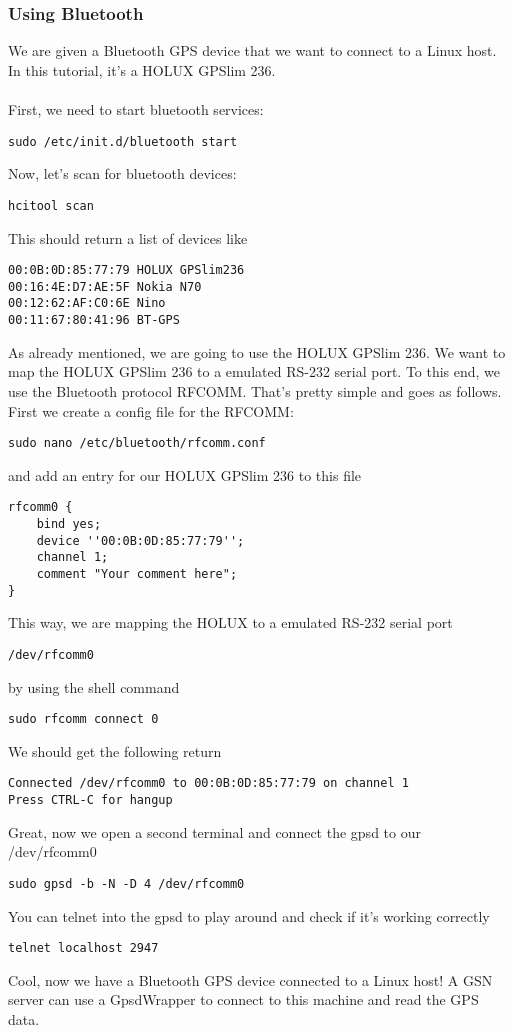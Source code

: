 \subsubsection{Using Bluetooth}
We are given a Bluetooth GPS device that we want to connect to a Linux host. In this tutorial, it's a HOLUX GPSlim 236.\\
\\
First, we need to start bluetooth services:
\begin{verbatim}
sudo /etc/init.d/bluetooth start
\end{verbatim}
Now, let's scan for bluetooth devices:
\begin{verbatim}
hcitool scan
\end{verbatim}
This should return a list of devices like
\begin{verbatim}
00:0B:0D:85:77:79 HOLUX GPSlim236
00:16:4E:D7:AE:5F Nokia N70
00:12:62:AF:C0:6E Nino
00:11:67:80:41:96 BT-GPS
\end{verbatim}
As already mentioned, we are going to use the HOLUX GPSlim 236. We want to map the HOLUX GPSlim 236 to a emulated RS-232 serial port. To this end, we use the Bluetooth protocol RFCOMM. That's pretty simple and goes as follows. First we create a config file for the RFCOMM:
\begin{verbatim}
sudo nano /etc/bluetooth/rfcomm.conf
\end{verbatim}
and add an entry for our HOLUX GPSlim 236 to this file
\begin{verbatim}
rfcomm0 {
	bind yes;
	device ''00:0B:0D:85:77:79'';
	channel 1;
	comment "Your comment here";
}
\end{verbatim}
This way, we are mapping the HOLUX to a emulated RS-232 serial port
\begin{verbatim}
/dev/rfcomm0
\end{verbatim}
by using the shell command
\begin{verbatim}
sudo rfcomm connect 0
\end{verbatim}
We should get the following return
\begin{verbatim}
Connected /dev/rfcomm0 to 00:0B:0D:85:77:79 on channel 1
Press CTRL-C for hangup
\end{verbatim}
Great, now we open a second terminal and connect the gpsd to our /dev/rfcomm0
\begin{verbatim}
sudo gpsd -b -N -D 4 /dev/rfcomm0
\end{verbatim}
You can telnet into the gpsd to play around and check if it's working correctly
\begin{verbatim}
telnet localhost 2947
\end{verbatim}
Cool, now we have a Bluetooth GPS device connected to a Linux host! A GSN server can use a GpsdWrapper to connect to this machine and read the GPS data.

